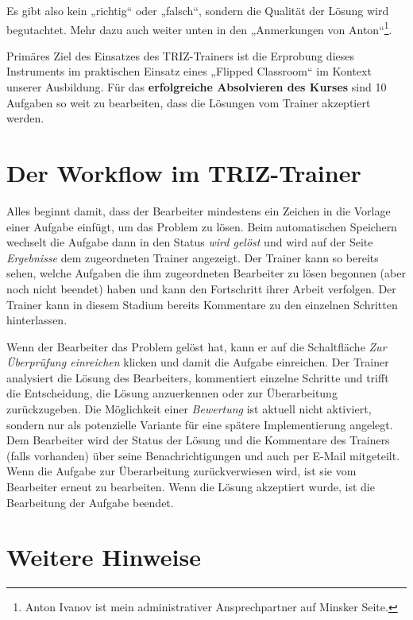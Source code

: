 \documentclass[11pt,a4paper]{article}
\begin{document}
Es gibt also kein „richtig“ oder „falsch“, sondern die Qualität der Lösung
wird begutachtet. Mehr dazu auch weiter unten in den „Anmerkungen von
Anton“\footnote{Anton Ivanov ist mein administrativer Ansprechpartner auf
  Minsker Seite.}.

Primäres Ziel des Einsatzes des TRIZ-Trainers ist die Erprobung dieses
Instruments im praktischen Einsatz eines „Flipped Classroom“ im Kontext
unserer Ausbildung.  Für das \textbf{erfolgreiche Absolvieren des Kurses} sind
10 Aufgaben so weit zu bearbeiten, dass die Lösungen vom Trainer akzeptiert
werden. 

\section{Der Workflow im TRIZ-Trainer}

Alles beginnt damit, dass der Bearbeiter mindestens ein Zeichen in die Vorlage
einer Aufgabe einfügt, um das Problem zu lösen. Beim automatischen Speichern
wechselt die Aufgabe dann in den Status \emph{wird gelöst} und wird auf der
Seite \emph{Ergebnisse} dem zugeordneten Trainer angezeigt. Der Trainer kann
so bereits sehen, welche Aufgaben die ihm zugeordneten Bearbeiter zu lösen
begonnen (aber noch nicht beendet) haben und kann den Fortschritt ihrer Arbeit
verfolgen. Der Trainer kann in diesem Stadium bereits Kommentare zu den
einzelnen Schritten hinterlassen.

Wenn der Bearbeiter das Problem gelöst hat, kann er auf die Schaltfläche
\emph{Zur Überprüfung einreichen} klicken und damit die Aufgabe einreichen.
Der Trainer analysiert die Lösung des Bearbeiters, kommentiert einzelne
Schritte und trifft die Entscheidung, die Lösung anzuerkennen oder zur
Überarbeitung zurückzugeben. Die Möglichkeit einer \emph{Bewertung} ist
aktuell nicht aktiviert, sondern nur als potenzielle Variante für eine spätere
Implementierung angelegt. Dem Bearbeiter wird der Status der Lösung und die
Kommentare des Trainers (falls vorhanden) über seine Benachrichtigungen und
auch per E-Mail mitgeteilt.  Wenn die Aufgabe zur Überarbeitung
zurückverwiesen wird, ist sie vom Bearbeiter erneut zu bearbeiten. Wenn die
Lösung akzeptiert wurde, ist die Bearbeitung der Aufgabe beendet.

\section{Weitere Hinweise}
\end{document}
